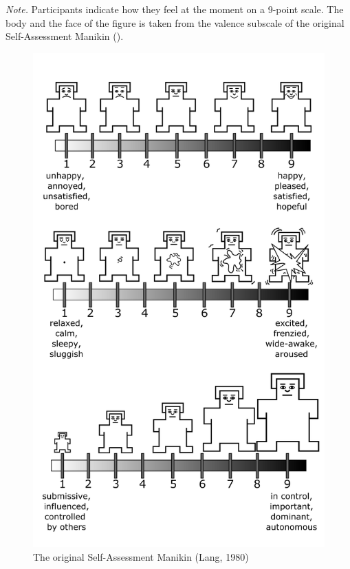 \documentclass[
]{udthesis}
\begin{document}
\emph{Note.} Participants indicate how they feel at the moment on a 9-point
scale. The body and the face of the figure is taken from the valence
subscale of the original Self-Assessment Manikin ().

\begin{figure}
\includegraphics[width=16.42in]{images/m-original-all} \caption{The original Self-Assessment Manikin (Lang, 1980)}\label{fig:original-manikins}
\end{figure}
\end{document}
